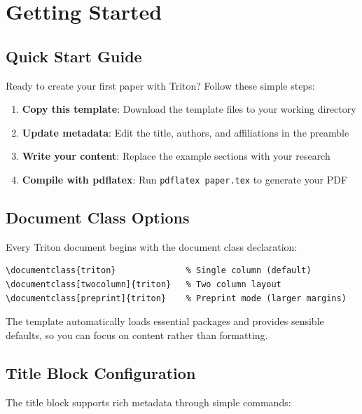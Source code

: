 \documentclass{triton}
\begin{document}
\section{Getting Started}

\subsection{Quick Start Guide}

Ready to create your first paper with Triton? Follow these simple steps:

\begin{enumerate}[leftmargin=20pt]
    \item \textbf{Copy this template}: Download the template files to your working directory
    \item \textbf{Update metadata}: Edit the title, authors, and affiliations in the preamble
    \item \textbf{Write your content}: Replace the example sections with your research
    \item \textbf{Compile with pdflatex}: Run \texttt{pdflatex paper.tex} to generate your PDF
\end{enumerate}

\subsection{Document Class Options}

Every Triton document begins with the document class declaration:
\begin{tcolorbox}[colback=ucsdgold!8,colframe=ucsdgold,title=Document Class Options]
\begin{verbatim}
\documentclass{triton}              % Single column (default)
\documentclass[twocolumn]{triton}   % Two column layout
\documentclass[preprint]{triton}    % Preprint mode (larger margins)
\end{verbatim}
\end{tcolorbox}

The template automatically loads essential packages and provides sensible defaults, so you can focus on content rather than formatting.

\subsection{Title Block Configuration}

The title block supports rich metadata through simple commands:
\end{document}
